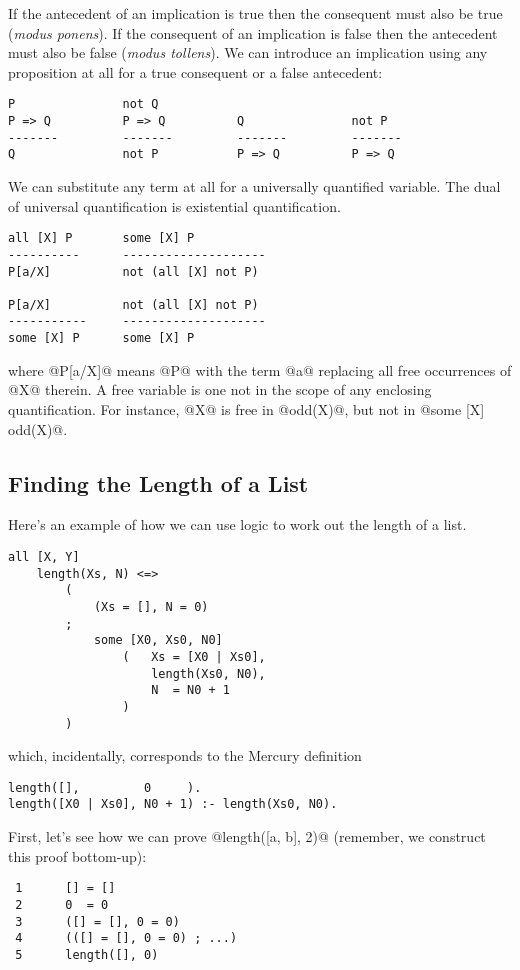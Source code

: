 \begin{itemize}
If the antecedent of an implication is true then the consequent must
also be true (\emph{modus ponens}).
If the consequent of an implication is false then the antecedent must
also be false (\emph{modus tollens}).
We can introduce an implication using any proposition at all for a true
consequent or a false antecedent:
\begin{verbatim}
P               not Q
P => Q          P => Q          Q               not P
-------         -------         -------         -------
Q               not P           P => Q          P => Q
\end{verbatim}

We can substitute any term at all for a universally quantified
variable.
The dual of universal quantification is existential quantification.
\begin{verbatim}
all [X] P       some [X] P
----------      --------------------
P[a/X]          not (all [X] not P)

P[a/X]          not (all [X] not P)
-----------     --------------------
some [X] P      some [X] P
\end{verbatim}
where @P[a/X]@ means @P@ with the term @a@ replacing all free
occurrences of @X@ therein.  A free variable is one not in the scope of
any enclosing quantification.  For instance, @X@ is free in @odd(X)@,
but not in @some [X] odd(X)@.


\subsection{Finding the Length of a List}

Here's an example of how we can use logic to work out the length of a
list.
\begin{verbatim}
all [X, Y]
    length(Xs, N) <=>
        (
            (Xs = [], N = 0)
        ;
            some [X0, Xs0, N0]
                (   Xs = [X0 | Xs0],
                    length(Xs0, N0),
                    N  = N0 + 1
                )
        )
\end{verbatim}
which, incidentally, corresponds to the Mercury definition
\begin{verbatim}
length([],         0     ).
length([X0 | Xs0], N0 + 1) :- length(Xs0, N0).
\end{verbatim}

First, let's see how we can prove @length([a, b], 2)@ (remember, we
construct this proof bottom-up):
\begin{verbatim}
 1      [] = []
 2      0  = 0
 3      ([] = [], 0 = 0)
 4      (([] = [], 0 = 0) ; ...)
 5      length([], 0)


\end{verbatim}
\end{itemize}
